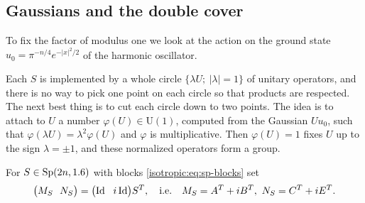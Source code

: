 \subsection{Gaussians and the double cover}

To fix the factor of modulus one we look at the action on the ground state
$u_0=\pi^{-n/4}e^{-|x|^2/2}$ of the harmonic oscillator.

\begin{discussion}
Each $S$ is implemented by a whole circle $\{\lambda U;\ |\lambda|=1\}$ of
unitary operators, and there is no way to pick one point on each circle so
that products are respected. The next best thing is to cut each circle down
to two points. The idea is to attach to $U$ a number $\varphi(U)\in\mathrm
U(1)$, computed from the Gaussian $Uu_0$, such that
$\varphi(\lambda U)=\lambda^2\varphi(U)$ and $\varphi$ is multiplicative.
Then $\varphi(U)=1$ fixes $U$ up to the sign $\lambda=\pm1$, and these
normalized operators form a group.
\end{discussion}
 For
$S\in\mathrm{Sp}(2n,1.6)$ with blocks \eqref{isotropic:eq:sp-blocks} set
\begin{equation}\label{isotropic:eq:MNZ}
  \bigl(M_S\ \ N_S\bigr)=\bigl(\Id\ \ i\Id\bigr)S^T,\quad\text{i.e.}\quad
  M_S=A^T+iB^T,\ N_S=C^T+iE^T .
\end{equation}

